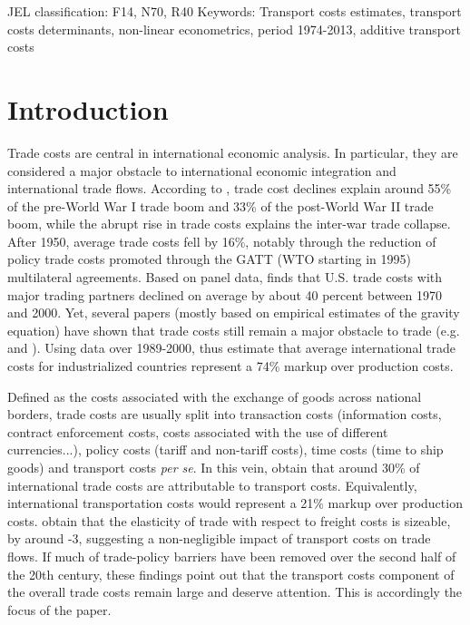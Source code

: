 \documentclass[a4paper,11pt]{article}
\begin{document}
\thispagestyle{empty} \pagestyle{plain} \setcounter{page}{1}



{\normalsize JEL classification: F14, N70, R40\newline
Keywords: Transport costs estimates, transport costs determinants, non-linear econometrics, period 1974-2013, additive transport costs }

{\normalsize \vspace{0cm} }

{\normalsize \titlepage }

{\normalsize \newpage }


\section{Introduction}


\noindent Trade costs are central in international economic analysis. In particular, they are considered a major obstacle to international economic integration and international trade flows. According to \citet{Jacks08}, trade cost declines explain around 55\% of the pre-World War I trade boom and 33\% of the post-World War II trade boom, while the abrupt rise in trade costs explains the inter-war trade collapse. After 1950, average trade costs fell by 16\%, notably through the reduction of policy trade costs promoted through the GATT (WTO starting in 1995) multilateral agreements.
Based on panel data, \citet{novy13} finds  that U.S. trade costs with major trading partners declined on average by about 40 percent between 1970 and 2000.
Yet, several papers (mostly based on empirical estimates of the gravity equation) have shown that trade costs still remain a major obstacle to trade (e.g. \citealp{Head_Mayer04} and \citealp{Disdier_Head08}). Using data over 1989-2000, \citet{anderson_wincoop_jel} thus estimate that average international trade costs for industrialized countries represent a 74\% markup over production costs.

Defined as the costs associated with the exchange of goods across national borders, trade costs are usually split into transaction costs (information costs, contract enforcement costs, costs associated with the use of different currencies...), policy costs (tariff  and non-tariff costs), time costs (time to ship goods) and transport costs \emph{per se}. In this vein, \citet{anderson_wincoop_jel} obtain that around 30\% of international trade costs are attributable to transport costs. Equivalently, international transportation costs would represent a 21\% markup over production costs. \citet{Behar_Venables} obtain that the elasticity of trade with respect to freight costs is sizeable, by around -3, suggesting a non-negligible impact of transport costs on trade flows. If much of trade-policy barriers have been removed over the second half of the 20th century, these findings point out that the transport costs component of the overall trade costs remain large and deserve attention. This is accordingly the focus of the paper.\smallskip
\end{document}
